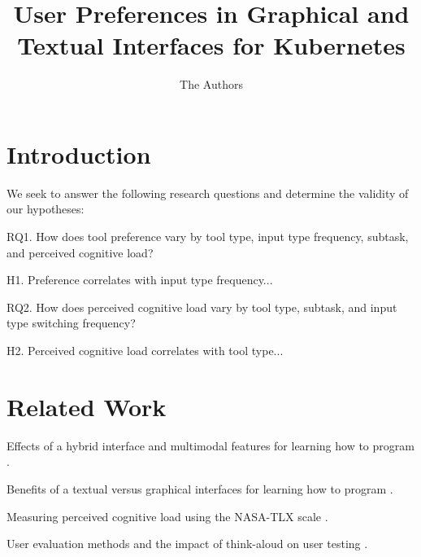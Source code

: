 \documentclass[11pt, oneside]{article}   	%
\title{User Preferences in Graphical and Textual Interfaces for Kubernetes}
\author{The Authors}
\begin{document}
\maketitle

\section{Introduction}
We seek to answer the following research questions and determine the validity of our hypotheses:

RQ1. How does tool preference vary by tool type, input type frequency, subtask, and perceived cognitive load?

H1. Preference correlates with input type frequency...

RQ2. How does perceived cognitive load vary by tool type, subtask, and input type switching frequency?

H2. Perceived cognitive load correlates with tool type...

\section{Related Work}
Effects of a hybrid interface and multimodal features for learning how to program \cite{unal2021effects, grafsgaard2014additive}.

Benefits of a textual versus graphical interfaces for learning how to program \cite{dillon2012comparing}.

Measuring perceived cognitive load using the NASA-TLX scale \cite{hart1988development}.

User evaluation methods and the impact of think-aloud on user testing \cite{mcdonald2020impact, ericsson1984protocol, fox2011procedures}. 
\end{document}
